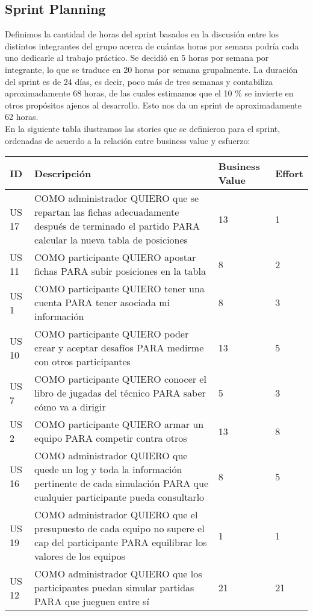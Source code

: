 \subsection{Sprint Planning}
\label{subsec:sprint}

\indent Definimos la cantidad de horas del sprint basados en la discusión entre los distintos integrantes del grupo acerca de cuántas horas por semana podría cada uno dedicarle al trabajo práctico. Se decidió en 5 horas por semana por integrante, lo que se traduce en 20 horas por semana grupalmente. La duración del sprint es de 24 días, es decir, poco más de tres semanas y contabiliza aproximadamente 68 horas, de las cuales estimamos que el 10 \% se invierte en otros propósitos ajenos al desarrollo. Esto nos da un sprint de aproximadamente 62 horas.\\

\indent En la siguiente tabla ilustramos las stories que se definieron para el sprint, ordenadas de acuerdo a la relación entre business value y esfuerzo:\\

\begin{center}
  \begin{tabular}{| l | p{10cm} | l | l | }
    \hline
ID & Descripción & Business Value & Effort\\  \hline
US 17 & COMO administrador QUIERO que se repartan las fichas adecuadamente después de terminado el partido PARA calcular la nueva tabla de posiciones & 13 & 1\\  \hline
US 11 & COMO participante QUIERO apostar fichas PARA subir posiciones en la tabla & 8 & 2\\  \hline
US 1 & COMO participante QUIERO tener una cuenta PARA tener asociada mi información & 8 & 3\\  \hline
US 10 & COMO participante QUIERO poder crear y aceptar desafíos PARA medirme con otros participantes & 13 & 5\\  \hline
US 7 & COMO participante QUIERO conocer el libro de jugadas del técnico PARA saber cómo va a dirigir & 5 & 3\\  \hline
US 2 & COMO participante QUIERO armar un equipo PARA competir contra otros & 13 & 8\\  \hline
US 16 & COMO administrador QUIERO que quede un log y toda la información pertinente de cada simulación PARA que cualquier participante pueda consultarlo & 8 & 5\\  \hline
US 19 & COMO administrador QUIERO que el presupuesto de cada equipo no supere el cap del participante PARA equilibrar los valores de los equipos & 1 & 1\\  \hline
US 12 & COMO administrador QUIERO que los participantes puedan simular partidas PARA que jueguen entre sí & 21 & 21\\  \hline
  \end{tabular}
\end{center}



